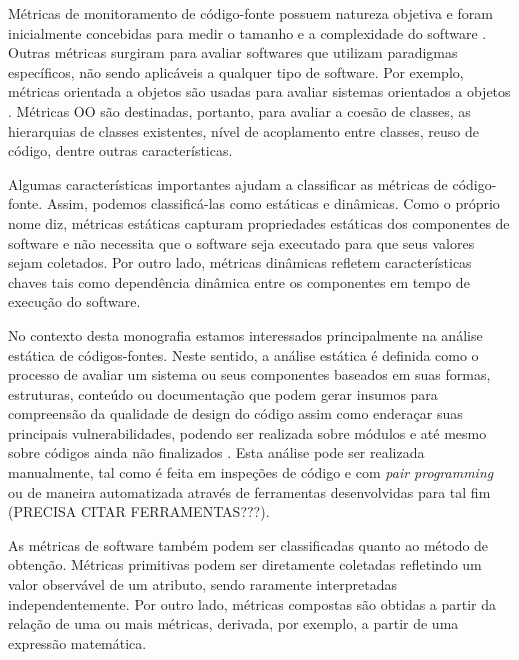 %

Métricas de monitoramento de código-fonte possuem natureza objetiva e foram inicialmente concebidas para medir o tamanho e a complexidade do software \cite{henry1984kafura}\cite{troy1981zweben}\cite{yau1985zweben}. Outras métricas surgiram para avaliar softwares que utilizam paradigmas específicos, não sendo aplicáveis a qualquer tipo de software. Por exemplo, métricas orientada a objetos são usadas para avaliar sistemas orientados a objetos \cite{systa2000}. Métricas OO são destinadas, portanto, para avaliar a coesão de classes, as hierarquias de classes existentes, nível de acoplamento entre classes, reuso de código, dentre outras características.

%

Algumas características importantes ajudam a classificar as métricas de código-fonte. Assim, podemos classificá-las como estáticas e dinâmicas. Como o próprio nome diz, métricas estáticas capturam propriedades estáticas dos componentes de software e não necessita que o software seja executado para que seus valores sejam coletados. Por outro lado, métricas dinâmicas refletem características chaves tais como dependência dinâmica entre os componentes em tempo de execução do software.

%

No contexto desta monografia estamos interessados principalmente na análise estática de códigos-fontes. Neste sentido, a análise estática é definida como o processo de avaliar um sistema ou seus componentes baseados em suas formas, estruturas, conteúdo ou documentação que podem gerar insumos para compreensão da qualidade de design do código assim como enderaçar suas principais vulnerabilidades, podendo ser realizada sobre módulos e até mesmo sobre códigos ainda não finalizados \cite{black2009}. Esta análise pode ser realizada manualmente, tal como é feita em inspeções de código e com \emph{pair programming} ou de maneira automatizada através de ferramentas desenvolvidas para tal fim (PRECISA CITAR FERRAMENTAS???). 

%

As métricas de software também podem ser classificadas quanto ao método de obtenção. Métricas primitivas podem ser diretamente coletadas refletindo um valor observável de um atributo, sendo raramente interpretadas independentemente. Por outro lado, métricas compostas são obtidas a partir da relação de uma ou mais métricas, derivada, por exemplo, a partir de uma expressão matemática.

%

